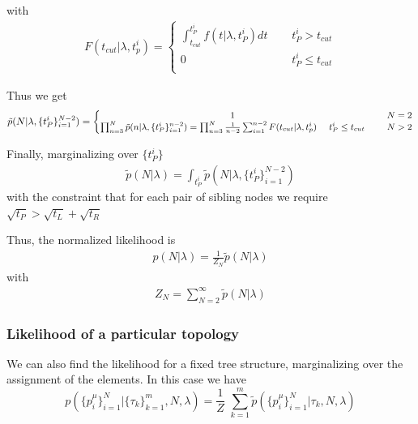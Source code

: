 \documentclass[12pt]{article}
\begin{document}
with
\begin{eqnarray}
F(t_{cut} | \lambda, t_p^i) =
\left\{    
\begin{matrix}
\int_{t_{cut}}^{t_P^i} f(t| \lambda, t_P^i) dt \,\,\,\,\,\,\,\, &t_P^i>t_{cut}\\
0 \,\,\,\,\,\,\,\,& t_P^i \leq t_{cut} \\
\end{matrix}\right.
\end{eqnarray}

Thus we get
\begin{eqnarray}
\small{
\tilde{p} (N | \lambda, \{t_P^i\}_{i=1}^{N-2}) =
\left\{    
\begin{matrix}
1 \,\,\,\,\,\,\,\, & N=2\\
\prod_{n=3}^N \tilde{p}(n| \lambda,  \{t_P^i\}_{i=1}^{n-2})  = \prod_{n=3}^N  \frac{1}{n-2} \sum_{i=1}^{n-2} F(t_{cut} | \lambda, t_p^i) \,\,\,\,\,\,\,\, t_P^i \leq t_{cut}\,\,\,\,\,\,\,\, & N>2 \\
\end{matrix}\right.
}
\end{eqnarray}


Finally, marginalizing over $\{t_P^i\}$
\begin{eqnarray}
\tilde{p}(N|\lambda) = \int_{t_P^i} \tilde{p} (N | \lambda, \{t_P^i\}_{i=1}^{N-2}) 
\end{eqnarray}
with the constraint that for each pair of sibling nodes we require $\sqrt{t_P} > \sqrt{t_L} + \sqrt{t_R}$

Thus, the normalized likelihood is 
\begin{eqnarray}
p(N | \lambda) = \frac{1}{Z_N} \tilde{p}(N|\lambda)
\end{eqnarray}
with 
\begin{eqnarray}
Z_N = \sum_{N=2}^\infty  \tilde{p}(N|\lambda)
\end{eqnarray}
\subsubsection{ Likelihood of a particular topology}

We can also find the likelihood for a fixed tree structure, marginalizing over the assignment of the elements. In this case we have 
\begin{equation}
 p(\{p_i^\mu\}_{i=1}^N| \{\tau_k\}_{k=1}^m , N, \lambda) = \frac{1}{Z}\,\, \sum_{k=1}^m \tilde{p}(\{p_i^\mu\}_{i=1}^N| \tau_k , N, \lambda)
\end{equation}
\end{document}
